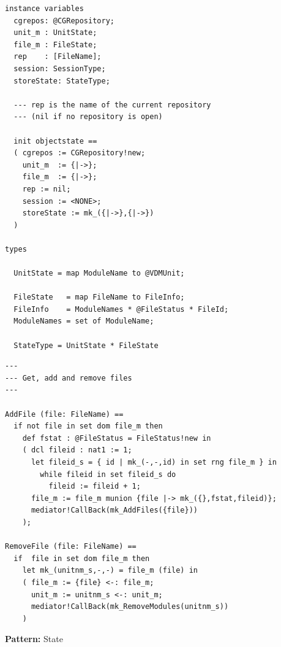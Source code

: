 \documentclass[dvips]{slides}
\newcommand{\omt}[1]{\resizebox{\textwidth}{!}{\rotatebox{-90}{\texttt{[image: \#1]}}}}
\begin{document}
\begin{slide}{}

\tiny
\begin{verbatim}
instance variables
  cgrepos: @CGRepository;
  unit_m : UnitState;
  file_m : FileState;
  rep    : [FileName];
  session: SessionType;
  storeState: StateType;

  --- rep is the name of the current repository
  --- (nil if no repository is open)

  init objectstate ==
  ( cgrepos := CGRepository!new;
    unit_m  := {|->};
    file_m  := {|->};
    rep := nil;
    session := <NONE>;
    storeState := mk_({|->},{|->})
  )

types
 
  UnitState = map ModuleName to @VDMUnit;

  FileState   = map FileName to FileInfo;
  FileInfo    = ModuleNames * @FileStatus * FileId;
  ModuleNames = set of ModuleName;

  StateType = UnitState * FileState
\end{verbatim}
\end{slide}


\begin{slide}{}

\tiny
\begin{verbatim}
---
--- Get, add and remove files
--- 

AddFile (file: FileName) ==
  if not file in set dom file_m then
    def fstat : @FileStatus = FileStatus!new in
    ( dcl fileid : nat1 := 1;
      let fileid_s = { id | mk_(-,-,id) in set rng file_m } in
        while fileid in set fileid_s do
          fileid := fileid + 1;
      file_m := file_m munion {file |-> mk_({},fstat,fileid)};
      mediator!CallBack(mk_AddFiles({file})) 
    );

RemoveFile (file: FileName) ==
  if  file in set dom file_m then
    let mk_(unitnm_s,-,-) = file_m (file) in
    ( file_m := {file} <-: file_m;
      unit_m := unitnm_s <-: unit_m;
      mediator!CallBack(mk_RemoveModules(unitnm_s))
    )
\end{verbatim}
\end{slide}



\begin{slide}{}

{\bf Pattern:} State

\begin{center}
\omt{error.eps}
\end{center}
\end{slide}
\end{document}
